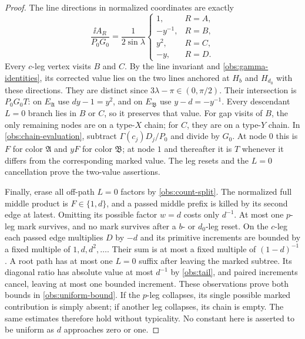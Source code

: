 \begin{proof}
The line directions in normalized coordinates are exactly
\begin{equation}
 \frac{\ii A_R}{P_0G_0}
 =\frac1{2\sin\lambda}
 \begin{cases}1,&R=A,\\-y^{-1},&R=B,\\y^2,&R=C,\\-y,&R=D.
 \end{cases}
 \label{obs:directions}
\end{equation}
Every $c$-leg vertex visits $B$ and $C$.  By the line invariant
and \eqref{obs:gamma-identities}, its corrected value lies on the
two lines anchored at $H_b$ and $H_{d_0}$ with these directions.
They are distinct since $3\lambda-\pi\in(0,\pi/2)$.
Their intersection is $P_0G_0T$: on $E_{\mathfrak A}$ use
$dy-1=y^2$, and on $E_{\mathfrak B}$ use $y-d=-y^{-1}$.
Every descendant $L=0$ branch lies in $B$ or $C$, so it preserves
that value.  For gap visits of $B$, the only remaining nodes are
on a type-$X$ chain; for $C$, they are on a type-$Y$ chain.
In \eqref{obs:chain-evaluation}, subtract
$\Gamma(c_j)D_j/P_0$ and divide by $G_0$.
At node $0$ this is $F$ for color $\mathfrak A$ and $yF$ for
color $\mathfrak B$; at node $1$ and thereafter it is $T$ whenever
it differs from the corresponding marked value.  The leg resets
and the $L=0$ cancellation prove the two-value assertions.

Finally, erase all off-path $L=0$ factors by
\eqref{obs:count-split}.  The normalized full middle product is
$F\in\{1,d\}$, and a passed middle prefix is killed by its second
edge at latest.  Omitting its possible factor $w=d$ costs only
$d^{-1}$.  At most one $p$-leg mark survives, and no mark survives
after a $b$- or $d_0$-leg reset.  On the $c$-leg each passed edge
multiplies $D$ by $-d$ and its primitive increments are bounded by
a fixed multiple of $1,d,d^2,\ldots$.  Their sum is at most a
fixed multiple of $(1-d)^{-1}$.  A root path has at most one
$L=0$ suffix after leaving the marked subtree.  Its diagonal
ratio has absolute value at most $d^{-1}$ by \eqref{obs:tail},
and paired increments cancel, leaving at most one bounded
increment.  These observations prove both bounds in
\eqref{obs:uniform-bound}.  If the $p$-leg collapses, its single
possible marked contribution is simply absent; if another leg
collapses, its chain is empty.  The same estimates therefore hold
without typicality.  No constant here is asserted to be uniform
as $d$ approaches zero or one.
\end{proof}

